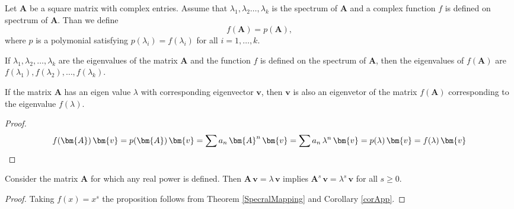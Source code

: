 \begin{df}
Let $\bm{A}$ be a square matrix with complex entries. Assume that $\lambda_1,\lambda_2\dots,\lambda_k$ is the spectrum of $\bm{A}$ and a complex function $f$ is defined on spectrum of $\bm{A}$. Than we define
\[f(\bm{A})=p(\bm{A}), \]
where $p$ is a polymonial satisfying $p(\lambda_i)=f(\lambda_i)$ for all $i=1,\dots,k$.
\end{df} 
\begin{thm}
\label{SpecralMapping}
If $\lambda_1,\lambda_2,\dots,\lambda_k$ are the eigenvalues of the matrix $\bm{A}$ and the function $f$ is defined on the spectrum of $\bm{A}$, then the eigenvalues of $f(\bm{A})$ are $f(\lambda_1),f(\lambda_2),\dots,f(\lambda_k)$.
\end{thm}
\begin{cor}
\label{corApp}
If the matrix $\bm{A}$ has an eigen value $\lambda$ with corresponding eigenvector $\bm{v}$, then $\bm{v}$ is also an eigenvetor of the matrix $f(\bm{A})$ corresponding to the eigenvalue $f(\lambda)$.
\begin{proof}
\[ 
f(\bm{A})\,\bm{v}=p(\bm{A})\,\bm{v}=\sum a_n \, \bm{A}^n \, \bm{v} =\sum a_n \, \lambda^n \, \bm{v} = p(\lambda)\,\bm{v}=f(\lambda)\,\bm{v} \qedhere
\]
\end{proof}
\end{cor}
\begin{prop}
\label{propB4}
Consider the matrix $\bm{A}$ for which any real power is defined. Then $\bm{A}\,\bm{v}=\lambda\,\bm{v}$ implies $\bm{A}^s\,\bm{v}=\lambda^s\,\bm{v}$ for all $s\geq0$.
\end{prop}
\begin{proof}
Taking $f(x)=x^s$ the proposition follows from Theorem \ref{SpecralMapping} and Corollary \ref{corApp}.
\end{proof}